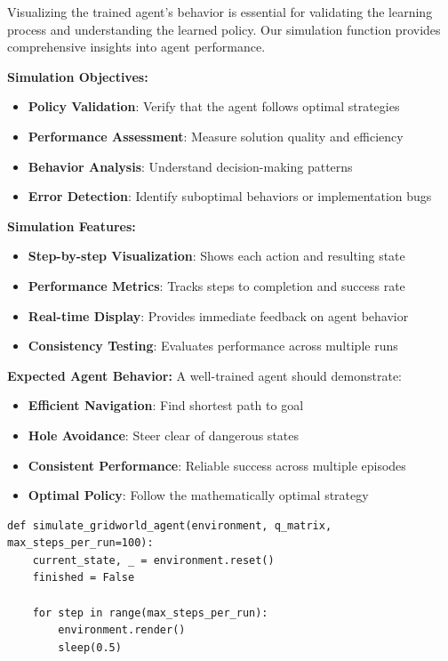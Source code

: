 \documentclass[12pt]{article}
\begin{document}
{{{Visualizing the trained agent's behavior is essential for validating the learning process and understanding the learned policy. Our simulation function provides comprehensive insights into agent performance.

\textbf{Simulation Objectives:}
\begin{itemize}
    \item \textbf{Policy Validation}: Verify that the agent follows optimal strategies
    \item \textbf{Performance Assessment}: Measure solution quality and efficiency
    \item \textbf{Behavior Analysis}: Understand decision-making patterns
    \item \textbf{Error Detection}: Identify suboptimal behaviors or implementation bugs
\end{itemize}

\textbf{Simulation Features:}
\begin{itemize}
    \item \textbf{Step-by-step Visualization}: Shows each action and resulting state
    \item \textbf{Performance Metrics}: Tracks steps to completion and success rate
    \item \textbf{Real-time Display}: Provides immediate feedback on agent behavior
    \item \textbf{Consistency Testing}: Evaluates performance across multiple runs
\end{itemize}

\textbf{Expected Agent Behavior:}
A well-trained agent should demonstrate:
\begin{itemize}
    \item \textbf{Efficient Navigation}: Find shortest path to goal
    \item \textbf{Hole Avoidance}: Steer clear of dangerous states
    \item \textbf{Consistent Performance}: Reliable success across multiple episodes
    \item \textbf{Optimal Policy}: Follow the mathematically optimal strategy
\end{itemize}

\begin{verbatim}
def simulate_gridworld_agent(environment, q_matrix, max_steps_per_run=100):
    current_state, _ = environment.reset()
    finished = False    
    
    for step in range(max_steps_per_run):            
        environment.render()
        sleep(0.5)  
        

\end{verbatim}}}}
\end{document}
